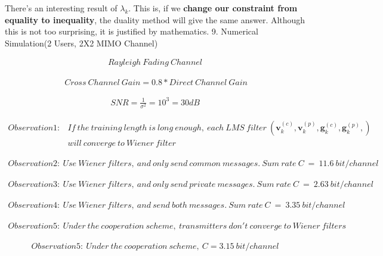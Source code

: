 \documentclass[11pt, oneside]{article}   	%
\begin{document}
\newpage
\newpage
There's an interesting result of $\lambda_{k}$. This is, if we \textbf{change our constraint from equality to inequality}, the duality method will give the same answer. Although this is not too surprising, it is justified by mathematics.
9. Numerical Simulation(2 Users, 2X2 MIMO Channel)


\begin{align*}
Rayleigh\ Fading\ Channel
\end{align*}

\begin{align*}
\ Cross\ Channel\ Gain = 0.8*Direct\ Channel\ Gain
\end{align*}

\begin{align*}
SNR = \frac {1}{\sigma^2} = 10^3=30dB
\end{align*}

\begin{align*}
Observation1: &If\ the\ training\ length\ is\ long\ enough,\ each\ LMS\ filter\ (\textbf{v}^{(c)}_{k},\textbf{v}^{(p)}_{k},\textbf{g}^{(c)}_{k},\textbf{g}^{(p)}_{k},)\\
&will\ converge\ to\ Wiener\ filter
\end{align*}

\begin{align*}
Observation2:\ Use\ Wiener\ filters,\ and\ only\ send\ common\ messages.\ Sum\ rate\ C\ =\ 11.6\ bit/channel
\end{align*}

\begin{align*}
Observation3:\ Use\ Wiener\ filters,\ and\ only\ send\ private\ messages.\ Sum\ rate\ C\ =\ 2.63\ bit/channel
\end{align*}

\begin{align*}
Observation4:\ Use\ Wiener\ filters,\ and\  send\ both\ messages.\ Sum\ rate\ C\ =\ 3.35\ bit/channel
\end{align*}

\begin{align*}
Observation5:\ Under\ the\ cooperation\ scheme,\ transmitters\ don't\ converge\ to\ Wiener\ filters 
\end{align*}

\begin{align*}
Observation5:\ Under\ the\ cooperation\ scheme,\ C=3.15\ bit/channel
\end{align*}
\end{document}
